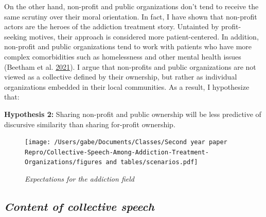 \documentclass[
  12pt,
]{article}
\begin{document}
On the other hand, non-profit and public organizations don't tend to receive the same scrutiny over their moral orientation. In fact, I have shown that non-profit actors are the heroes of the addiction treatment story. Untainted by profit-seeking motives, their approach is considered more patient-centered. In addition, non-profit and public organizations tend to work with patients who have more complex comorbidities such as homelessness and other mental health issues (Beetham et al. \protect\hyperlink{ref-beetham2021}{2021}). I argue that non-profits and public organizations are not viewed as a collective defined by their ownership, but rather as individual organizations embedded in their local communities. As a result, I hypothesize that:

\vspace{12pt}

\textbf{Hypothesis 2:} Sharing non-profit and public ownership will be less predictive of discursive similarity than sharing for-profit ownership.

\begin{figure}
\centering
\texttt{[image: /Users/gabe/Documents/Classes/Second year paper Repro/Collective-Speech-Among-Addiction-Treatment-Organizations/figures and tables/scenarios.pdf]}
\caption{\label{fig:unnamed-chunk-3}\textit{Expectations for the addiction field}}
\end{figure}

\hypertarget{content-of-collective-speech}{%
\subsection{\texorpdfstring{\emph{Content of collective speech}}{Content of collective speech}}\label{content-of-collective-speech}}
\end{document}
